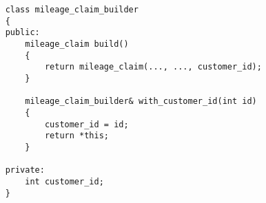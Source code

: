 \begin{verbatim}
    class mileage_claim_builder
    {
    public:
        mileage_claim build()
        {
            return mileage_claim(..., ..., customer_id);
        }
    
        mileage_claim_builder& with_customer_id(int id)
        {
            customer_id = id;
            return *this;
        }

    private:
        int customer_id;
    }
\end{verbatim}